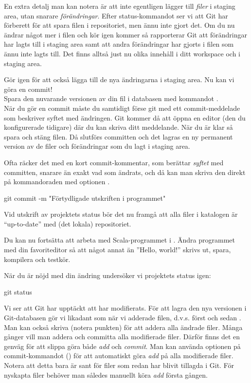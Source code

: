 \begin{Datorarbete}
	En extra detalj man kan notera är att  inte egentligen lägger till \emph{filer} i staging area, utan snarare \emph{förändringar}. Efter status-kommandot ser vi att Git har förberett för att spara filen i repositoriet, men ännu inte gjort det. Om du nu ändrar något mer i filen och kör  igen kommer så rapporterar Git att förändringar har lagts till i staging area samt att andra förändringar har gjorts i filen som ännu inte lagts till. Det finns alltså just nu olika innehåll i ditt workspace och i staging area.

	Gör  igen för att också lägga till de nya ändringarna i staging area. Nu kan vi göra en commit!
	\\

	\code{[\ref{git-commit}]} Spara den nuvarande versionen av din fil i databasen med kommandot .
	\\

	När du gör en commit måste du samtidigt förse git med ett commit-meddelade som beskriver syftet med ändringen. Git kommer då att öppna en editor (den du konfigurerade tidigare) där du kan skriva ditt meddelande. När du är klar så spara och stäng filen. Då slutförs committen och det lagras en ny permanent version av de filer och förändringar som du lagt i staging area.

	Ofta räcker det med en kort commit-kommentar, som berättar \emph{syftet} med committen, snarare än exakt vad som ändrats, och då kan man skriva den direkt på kommandoraden med optionen .

	\begin{Code}
		git commit -m "Förtydligade utskriften i programmet"
	\end{Code}

	Vid utskrift av projektets status bör det nu framgå att alla filer i katalogen är ``up-to-date'' med (det lokala) repositoriet.

	Du kan nu fortsätta att arbeta med Scala-programmet i . Ändra programmet med din favoriteditor så att något annat än ''Hello, world!'' skrivs ut, spara, kompilera och testkör.

	När du är nöjd med din ändring undersöker vi projektets status igen:

	\begin{Code}
		git status
	\end{Code}

	Vi ser att Git har upptäckt att  har modifierats. För att lagra den nya versionen i Git-databasen gör vi likadant som när vi adderade filen, d.v.s. först  och sedan . Man kan också skriva   (notera punkten) för att addera alla ändrade filer.	Många gånger vill man addera och committa alla modifierade filer. Därför finns det en genväg för att slippa göra både \emph{add} och \emph{commit}. Man kan använda optionen  på commit-kommandot () för att automatiskt göra \emph{add} på alla modifierade filer. Notera att detta bara är sant för filer som redan har blivit tillagda i Git. För nyskapta filer behöver man således manuellt köra \emph{add} första gången.
	\\


\end{Datorarbete}
